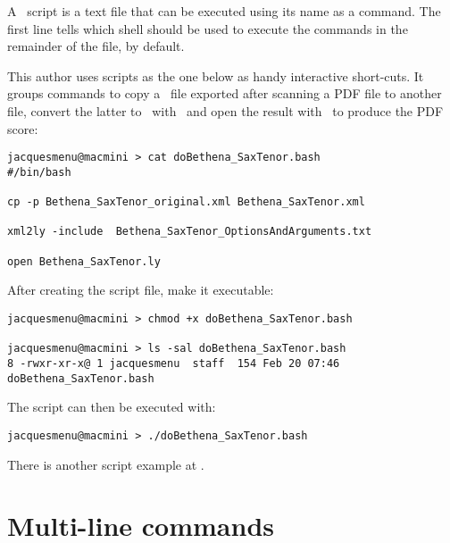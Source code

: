 A \shell\ script is a text file that can be executed using its name as a command. The first line tells which shell should be used to execute the commands in the remainder of the file,  by default.

This author uses scripts as the one below as handy interactive short-cuts. It groups commands to copy a \mxml\ file exported after scanning a PDF file to another file, convert the latter to \lily\ with \xmlToLy\ and open the result with \fresco\ to produce the PDF score:
\begin{lstlisting}[language=Terminal]
jacquesmenu@macmini > cat doBethena_SaxTenor.bash 
#/bin/bash

cp -p Bethena_SaxTenor_original.xml Bethena_SaxTenor.xml

xml2ly -include  Bethena_SaxTenor_OptionsAndArguments.txt

open Bethena_SaxTenor.ly
\end{lstlisting}

After creating the script file, make it executable:
\begin{lstlisting}[language=Terminal]
jacquesmenu@macmini > chmod +x doBethena_SaxTenor.bash

jacquesmenu@macmini > ls -sal doBethena_SaxTenor.bash 
8 -rwxr-xr-x@ 1 jacquesmenu  staff  154 Feb 20 07:46 doBethena_SaxTenor.bash
\end{lstlisting}

The script can then be executed with:
\begin{lstlisting}[language=Terminal]
jacquesmenu@macmini > ./doBethena_SaxTenor.bash 
\end{lstlisting}

There is another script example at .


\section{Multi-line commands}\label{Multi-line commands}

